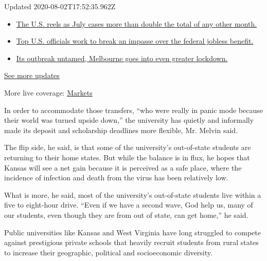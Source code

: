 Updated 2020-08-02T17:52:35.962Z

\begin{itemize}
\tightlist
\item
  \href{https://www.nytimes.com/2020/08/01/world/coronavirus-covid-19.html?action=click\&pgtype=Article\&state=default\&region=MAIN_CONTENT_1\&context=storylines_live_updates\#link-34047410}{The
  U.S. reels as July cases more than double the total of any other
  month.}
\item
  \href{https://www.nytimes.com/2020/08/01/world/coronavirus-covid-19.html?action=click\&pgtype=Article\&state=default\&region=MAIN_CONTENT_1\&context=storylines_live_updates\#link-780ec966}{Top
  U.S. officials work to break an impasse over the federal jobless
  benefit.}
\item
  \href{https://www.nytimes.com/2020/08/01/world/coronavirus-covid-19.html?action=click\&pgtype=Article\&state=default\&region=MAIN_CONTENT_1\&context=storylines_live_updates\#link-2bc8948}{Its
  outbreak untamed, Melbourne goes into even greater lockdown.}
\end{itemize}

\href{https://www.nytimes.com/2020/08/01/world/coronavirus-covid-19.html?action=click\&pgtype=Article\&state=default\&region=MAIN_CONTENT_1\&context=storylines_live_updates}{See
more updates}

More live coverage:
\href{https://www.nytimes.com/live/2020/07/31/business/stock-market-today-coronavirus?action=click\&pgtype=Article\&state=default\&region=MAIN_CONTENT_1\&context=storylines_live_updates}{Markets}

In order to accommodate those transfers, ``who were really in panic mode
because their world was turned upside down,'' the university has quietly
and informally made its deposit and scholarship deadlines more flexible,
Mr. Melvin said.

The flip side, he said, is that some of the university's out-of-state
students are returning to their home states. But while the balance is in
flux, he hopes that Kansas will see a net gain because it is perceived
as a safe place, where the incidence of infection and death from the
virus has been relatively low.

What is more, he said, most of the university's out-of-state students
live within a five to eight-hour drive. ``Even if we have a second wave,
God help us, many of our students, even though they are from out of
state, can get home,'' he said.

Public universities like Kansas and West Virginia have long struggled to
compete against prestigious private schools that heavily recruit
students from rural states to increase their geographic, political and
socioeconomic diversity.

